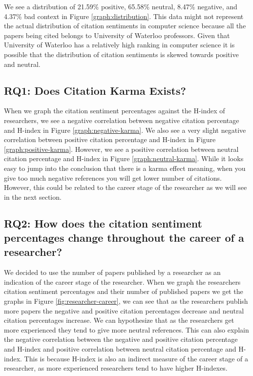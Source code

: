 \documentclass[sigconf]{acmart}
\begin{document}
We see a distribution of 21.59\% positive, 65.58\% neutral, 8.47\% negative, and 4.37\% bad context in Figure \ref{graph:distribution}. This data might not represent the actual distribution of citation sentiments in computer science because all the papers being cited belongs to University of Waterloo professors. Given that University of Waterloo has a relatively high ranking in computer science it is possible that the distribution of citation sentiments is skewed towards positive and neutral.

\subsection{RQ1: Does Citation Karma Exists?}
When we graph the citation sentiment percentages against the H-index of researchers, we see a negative correlation between negative citation percentage and H-index in Figure \ref{graph:negative-karma}. We also see a very slight negative correlation between positive citation percentage and H-index in Figure \ref{graph:positive-karma}. However, we see a positive correlation between neutral citation percentage and H-index in Figure \ref{graph:neutral-karma}. While it looks easy to jump into the conclusion that there is a karma effect meaning, when you give too much negative references you will get lower number of citations. However, this could be related to the career stage of the researcher as we will see in the next section.

\subsection{RQ2: How does the citation sentiment percentages change throughout the career of a researcher?}
We decided to use the number of papers published by a researcher as an indication of the career stage of the researcher. When we graph the researchers citation sentiment percentages and their number of published papers we get the graphs in Figure \ref{fig:researcher-career}, we can see that as the researchers publish more papers the negative and positive citation percentages decrease and neutral citation percentages increase. We can hypothesize that as the researchers get more experienced they tend to give more neutral references. This can also explain the negative correlation between the negative and positive citation percentage and H-index and positive correlation between neutral citation percentage and H-index. This is because H-index is also an indirect measure of the career stage of a researcher, as more experienced researchers tend to have higher H-indexes.
\end{document}
